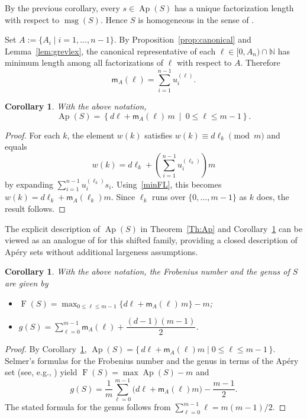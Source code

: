 \documentclass[12pt,a4paper]{amsart}
\newtheorem{corollary}[theorem]{Corollary}
\theoremstyle{definition}
\begin{document}
By the previous corollary, every $s\in\operatorname{Ap}(S)$ has a unique factorization length with respect to $\operatorname{msg}(S)$. Hence $S$ is homogeneous in the sense of \cite{JafariZarzuela18}.

Set $A:=\{A_i\mid i=1,\ldots,n-1\}$. By Proposition~\ref{prop:canonical} and Lemma~\ref{lem:grevlex}, the canonical representative of each $\ell\in[0,A_n)\cap\mathbb{N}$ has minimum length among all factorizations of $\ell$ with respect to $A$. Therefore
\begin{equation}\label{minFL}
\mathsf{m}_A(\ell)=\sum_{i=1}^{n-1}u_i^{(\ell)}.
\end{equation}

\begin{corollary}\label{cor.OP}
With the above notation,
\[
\operatorname{Ap}(S)=\left\{d\ell+\mathsf{m}_A(\ell)\,m\ \middle|\ 0\le \ell\le m-1\right\}.
\]
\end{corollary}

\begin{proof}
For each $k$, the element $w(k)$ satisfies $w(k)\equiv d\ell_k\pmod m$ and equals
\[
w(k)=d\ell_k+\left(\sum_{i=1}^{n-1}u_i^{(\ell_k)}\right)m
\]
by expanding $\sum_{i=1}^{n-1}u_i^{(\ell_k)}s_i$. Using~\eqref{minFL}, this becomes
$w(k)=d\ell_k+\mathsf{m}_A(\ell_k)m$. Since $\ell_k$ runs over $\{0,\ldots,m-1\}$ as $k$ does,
the result follows.
\end{proof}

The explicit description of $\operatorname{Ap}(S)$ in Theorem~\ref{Th:Ap} and Corollary~\ref{cor.OP} can be viewed as an analogue of \cite[Theorem~3.3]{ONeillPelayo18} for this shifted family, providing a closed description of Apéry sets without additional largeness assumptions.

\begin{corollary}\label{cor:FrobGen}
With the above notation, the Frobenius number and the genus of $S$ are given by
\begin{itemize}
    \item $\operatorname{F}(S) = \max_{0\le \ell\le m-1}\bigl\{d\ell+\mathsf{m}_A(\ell)\,m\bigr\}-m$;
    \item $g(S)=\sum_{\ell=0}^{m-1}\mathsf{m}_A(\ell)+\dfrac{(d-1)(m-1)}{2}$.
\end{itemize}
\end{corollary}

\begin{proof}
By Corollary~\ref{cor.OP}, $\operatorname{Ap}(S)=\{\,d\ell+\mathsf{m}_A(\ell)m \mid 0\le \ell\le m-1\,\}$.
Selmer's formulas for the Frobenius number and the genus in terms of the Ap\'ery set
(see, e.g., \cite[Proposition~2.12]{libro}) yield
$\operatorname{F}(S)=\max\operatorname{Ap}(S)-m$ and
\[
g(S)=\frac{1}{m}\sum_{\ell=0}^{m-1}\bigl(d\ell+\mathsf{m}_A(\ell)m\bigr)-\frac{m-1}{2}.
\]
The stated formula for the genus follows from
$\sum_{\ell=0}^{m-1}\ell=m(m-1)/2$.
\end{proof}
\end{document}
